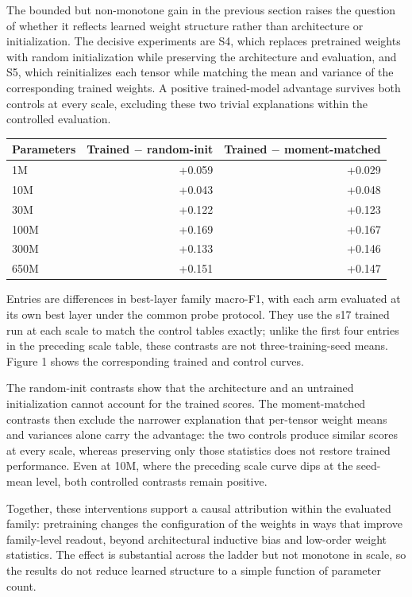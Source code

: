 The bounded but non-monotone gain in the previous section raises the question of whether it reflects learned weight structure rather than architecture or initialization. The decisive experiments are S4, which replaces pretrained weights with random initialization while preserving the architecture and evaluation, and S5, which reinitializes each tensor while matching the mean and variance of the corresponding trained weights. A positive trained-model advantage survives both controls at every scale, excluding these two trivial explanations within the controlled evaluation.

\begin{longtable}[]{@{}lrr@{}}
\toprule
Parameters & Trained \(-\) random-init & Trained \(-\) moment-matched \\
\midrule
\endhead
1M & +0.059 & +0.029 \\
10M & +0.043 & +0.048 \\
30M & +0.122 & +0.123 \\
100M & +0.169 & +0.167 \\
300M & +0.133 & +0.146 \\
650M & +0.151 & +0.147 \\
\bottomrule
\end{longtable}

Entries are differences in best-layer family macro-F1, with each arm evaluated at its own best layer under the common probe protocol. They use the s17 trained run at each scale to match the control tables exactly; unlike the first four entries in the preceding scale table, these contrasts are not three-training-seed means. Figure 1 shows the corresponding trained and control curves.

The random-init contrasts show that the architecture and an untrained initialization cannot account for the trained scores. The moment-matched contrasts then exclude the narrower explanation that per-tensor weight means and variances alone carry the advantage: the two controls produce similar scores at every scale, whereas preserving only those statistics does not restore trained performance. Even at 10M, where the preceding scale curve dips at the seed-mean level, both controlled contrasts remain positive.

Together, these interventions support a causal attribution within the evaluated family: pretraining changes the configuration of the weights in ways that improve family-level readout, beyond architectural inductive bias and low-order weight statistics. The effect is substantial across the ladder but not monotone in scale, so the results do not reduce learned structure to a simple function of parameter count.

